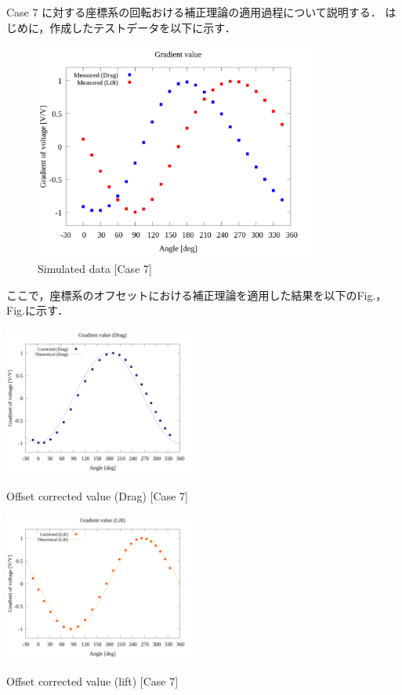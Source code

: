 Case 7 に対する座標系の回転おける補正理論の適用過程について説明する．
はじめに，作成したテストデータを以下に示す．

\begin{figure}[htbp]
    \footnotesize
    \begin{center}
        \includegraphics[width=95mm]{../../02_workspace/result/simulation_tx=10.0_ty=-5.0_dx=5.00_dy=-2.50/plot/05/05_summary-wave.png}
        \caption{Simulated data [Case 7]}
    \end{center}
\end{figure}

ここで，座標系のオフセットにおける補正理論を適用した結果を以下のFig.，Fig.に示す．

\begin{multicols}{2}
    \begin{figure_here}
        \begin{center}
            \includegraphics[width=65mm]{../../02_workspace/result/simulation_tx=10.0_ty=-5.0_dx=5.00_dy=-2.50/plot/21/21-2_corrected_offset_drag.png}
            \caption{Offset corrected value (Drag) [Case 7]}
            \includegraphics[width=65mm]{../../02_workspace/result/simulation_tx=10.0_ty=-5.0_dx=5.00_dy=-2.50/plot/21/21-2_corrected_offset_lift.png}
            \caption{Offset corrected value (lift) [Case 7]}
        \end{center}
    \end{figure_here}
\end{multicols}

